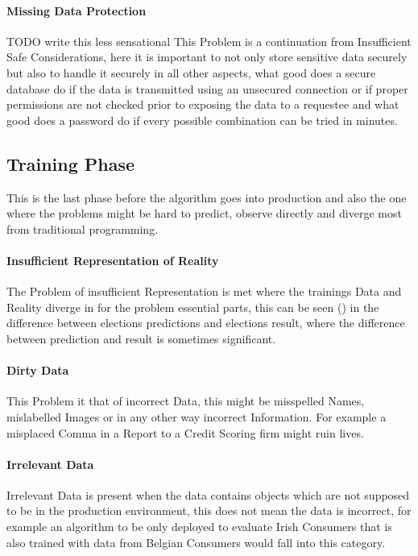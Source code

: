 \paragraph{Missing Data Protection}
{ \color{red} TODO write this less sensational }
This Problem is a continuation from Insufficient Safe Considerations, here it is important to not only store sensitive data securely but also to handle it securely in all other aspects, what good does a secure database do if the data is transmitted using an unsecured connection or if 
proper permissions are not checked prior to exposing the data to a requestee and what good does a password do if every possible combination can be tried in minutes.

\subsection{Training Phase}
This is the last phase before the algorithm goes into production and also the one where the problems might be hard to predict, observe directly and diverge most from traditional programming. 

\paragraph{Insufficient Representation of Reality}
The Problem of insufficient Representation is met where 
the trainings Data and Reality diverge in for the problem 
essential parts, this can be seen (\cite{2016}) in the difference between 
elections predictions and elections result, where the difference
between prediction and result is sometimes significant.

\paragraph{Dirty Data}
This Problem it that of incorrect Data, this might be misspelled Names, mislabelled Images or in any other way incorrect Information. For example a misplaced Comma in a Report to a Credit Scoring firm might ruin lives.

\paragraph{Irrelevant Data}
Irrelevant Data is present when the data contains 
objects which are not supposed to be in the production 
environment, this does not mean the data is incorrect,
for example an algorithm to be only deployed to evaluate
Irish Consumers that is also trained with data from 
Belgian Consumers would fall into this category.

